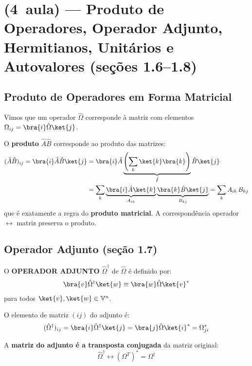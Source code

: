 \section*{(4\textordfeminine\ aula) --- Produto de Operadores, Operador Adjunto, Hermitianos, Unitários e Autovalores (seções 1.6--1.8)}

\subsection*{Produto de Operadores em Forma Matricial}

Vimos que um operador $\hat{\Omega}$ corresponde à matriz com elementos $\Omega_{ij} = \bra{i}\hat{\Omega}\ket{j}$.

O \textbf{produto} $\hat{A}\hat{B}$ corresponde ao produto das matrizes:
\begin{align}
    (\hat{A}\hat{B})_{ij} = \bra{i}\hat{A}\hat{B}\ket{j}
    &= \bra{i}\hat{A}\underbrace{\left(\sum_k \ket{k}\bra{k}\right)}_{\hat{I}}\hat{B}\ket{j} \notag \\
    &= \sum_k \underbrace{\bra{i}\hat{A}\ket{k}}_{A_{ik}} \underbrace{\bra{k}\hat{B}\ket{j}}_{B_{kj}}
     = \sum_k A_{ik}\, B_{kj}
\end{align}
que é exatamente a regra do \textbf{produto matricial}. A correspondência operador $\leftrightarrow$ matriz preserva o produto.

\subsection*{Operador Adjunto (seção 1.7)}

\begin{shadequote}
    O \textbf{OPERADOR ADJUNTO} $\hat{\Omega}^\dagger$ de $\hat{\Omega}$ é definido por:
    \begin{equation}
        \bra{v}\hat{\Omega}^\dagger\ket{w} \equiv \bra{w}\hat{\Omega}\ket{v}^*
        \label{eq:adjunto_def}
    \end{equation}
    para todos $\ket{v}, \ket{w} \in \mathbb{V}^n$.
\end{shadequote}

O elemento de matriz $(ij)$ do adjunto é:
\begin{equation}
    (\hat{\Omega}^\dagger)_{ij} = \bra{i}\hat{\Omega}^\dagger\ket{j} = \bra{j}\hat{\Omega}\ket{i}^* = \Omega_{ji}^*
\end{equation}

A \textbf{matriz do adjunto é a transposta conjugada} da matriz original:
\begin{equation}
    \hat{\Omega}^\dagger \leftrightarrow (\Omega^T)^* = \Omega^\dagger
\end{equation}

